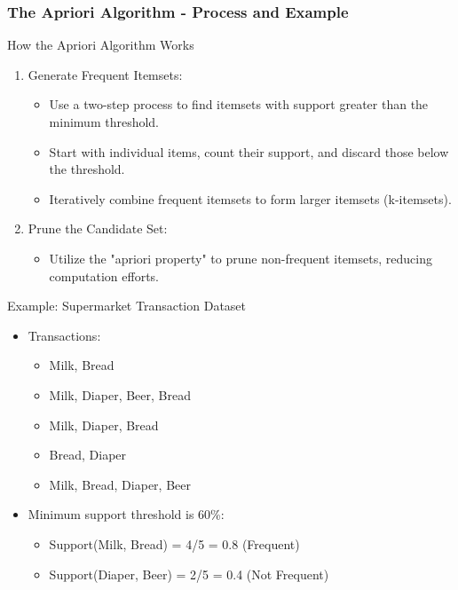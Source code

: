 \documentclass{beamer}
\begin{document}
\begin{frame}[fragile]
    \frametitle{The Apriori Algorithm - Process and Example}
    \begin{block}{How the Apriori Algorithm Works}
        \begin{enumerate}
            \item Generate Frequent Itemsets:
                \begin{itemize}
                    \item Use a two-step process to find itemsets with support greater than the minimum threshold.
                    \item Start with individual items, count their support, and discard those below the threshold.
                    \item Iteratively combine frequent itemsets to form larger itemsets (k-itemsets).
                \end{itemize}
            \item Prune the Candidate Set:
                \begin{itemize}
                    \item Utilize the "apriori property" to prune non-frequent itemsets, reducing computation efforts.
                \end{itemize}
        \end{enumerate}
    \end{block}

    \begin{block}{Example: Supermarket Transaction Dataset}
        \begin{itemize}
            \item Transactions:
                \begin{itemize}
                    \item {Milk, Bread}
                    \item {Milk, Diaper, Beer, Bread}
                    \item {Milk, Diaper, Bread}
                    \item {Bread, Diaper}
                    \item {Milk, Bread, Diaper, Beer}
                \end{itemize}
            \item Minimum support threshold is 60\%:
                \begin{itemize}
                    \item Support({Milk, Bread}) = 4/5 = 0.8 (Frequent)
                    \item Support({Diaper, Beer}) = 2/5 = 0.4 (Not Frequent)
                \end{itemize}
        \end{itemize}
    \end{block}
\end{frame}
\end{document}
